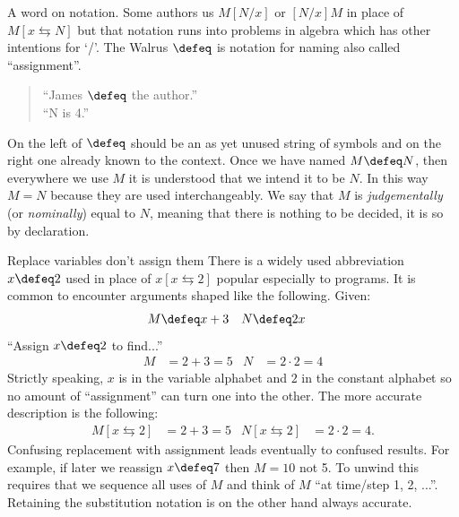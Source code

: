 A word on notation.  Some authors us $M[N/x]$ or $[N/x]M$ in place of $M[x\leftrightarrows N]$
but that notation runs into problems in algebra which has other intentions for `/'.
The Walrus $\defeq$ is notation for naming also called ``assignment''.
\begin{quote}
    ``James $\defeq$ the author.''\\
    ``N is 4.''
\end{quote}
On the left of $\defeq$ should be an as yet unused string of symbols and on the right 
one already known to the context.  Once we have named $M\defeq N$, then 
everywhere we use $M$ it is understood that we intend it to be $N$.
In this way $M=N$ because they are used interchangeably.  We say that 
$M$ is \emph{judgementally} (or \emph{nominally}) equal to $N$, meaning that there is 
nothing to be decided, it is so by declaration.

\begin{remark}{Replace variables don't assign them}
    There is a widely used abbreviation $x\defeq 2$ used 
    in place of $x[x\leftrightarrows 2]$ popular especially to programs.  
    It is common to encounter arguments shaped like the following.  Given:
    \begin{align*}
        M & \defeq x+3 & N & \defeq 2x
    \end{align*}
    ``Assign $x \defeq 2$ to find...''
    \begin{align*}
        M  & = 2+3 =5 & N & = 2\cdot 2 =4
    \end{align*}
    Strictly speaking, $x$ is in the variable alphabet and $2$ in the constant 
    alphabet so no amount of ``assignment'' can turn one into the other.
    The more accurate description is the following:
    \begin{align*}
        M[x\leftrightarrows 2] & = 2+3=5 & N[x\leftrightarrows 2] & = 2\cdot 2=4.
    \end{align*}
    Confusing replacement with assignment leads eventually to confused 
    results.  For example, if later we reassign $x\defeq 7$ then $M=10$ not 5.
    To unwind this requires that we sequence all uses of $M$ and think of $M$ 
    ``at time/step 1, 2, ...''.  Retaining the substitution notation is 
    on the other hand always accurate.
\end{remark}






